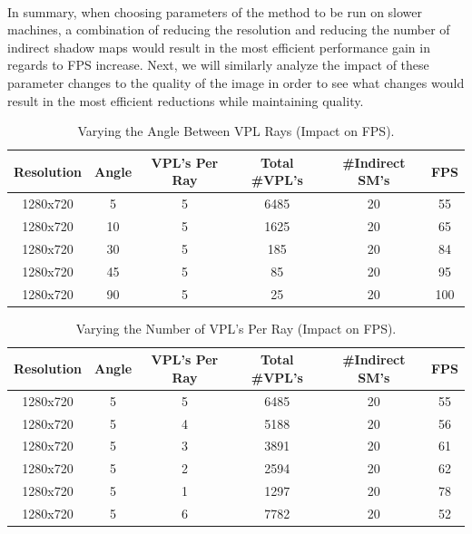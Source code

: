 \paragraph{}
In summary, when choosing parameters of the method to be run on slower machines, a combination of reducing the resolution and reducing the number of indirect shadow maps would result in the most efficient performance gain in regards to FPS increase.  Next, we will similarly analyze the impact of these parameter changes to the quality of the image in order to see what changes would result in the most efficient reductions while maintaining quality.
\vspace{5mm}
\begin{table}[h!]
	\caption{Varying the Angle Between VPL Rays (Impact on FPS).}
	\begin{center}
	    \begin{tabular}{ | c | c | c | c | c | c |}
	    \hline
	    Resolution & Angle & VPL's Per Ray & Total \#VPL's & \#Indirect SM's & FPS\\ \hline
	    1280x720 & 5 & 5 & 6485 & 20 & 55\\ \hline \centering
	    1280x720 & 10 & 5 & 1625 & 20 & 65\\ \hline
	    1280x720 & 30 & 5 & 185 & 20 & 84\\ \hline
	    1280x720 & 45 & 5 & 85 & 20 & 95\\ \hline
	    1280x720 & 90 & 5 & 25 & 20 & 100\\ \hline
	    \end{tabular}
	\end{center}
	\label{table:5.1}
\end{table}

\begin{table}[h!]\centering
	\caption{Varying the Number of VPL's Per Ray (Impact on FPS).}
	\begin{center}
	    \begin{tabular}{ | c | c | c | c | c | c |}
	    \hline
	    Resolution & Angle & VPL's Per Ray & Total \#VPL's & \#Indirect SM's & FPS\\ \hline
	    1280x720 & 5 & 5 & 6485 & 20 & 55\\ \hline
	    1280x720 & 5 & 4 & 5188 & 20 & 56\\ \hline
	    1280x720 & 5 & 3 & 3891 & 20 & 61\\ \hline
	    1280x720 & 5 & 2 & 2594 & 20 & 62\\ \hline
	    1280x720 & 5 & 1 & 1297 & 20 & 78\\ \hline
	    1280x720 & 5 & 6 & 7782 & 20 & 52\\ \hline
	    \end{tabular}
	\end{center}
	\label{table:5.2}
\end{table}

